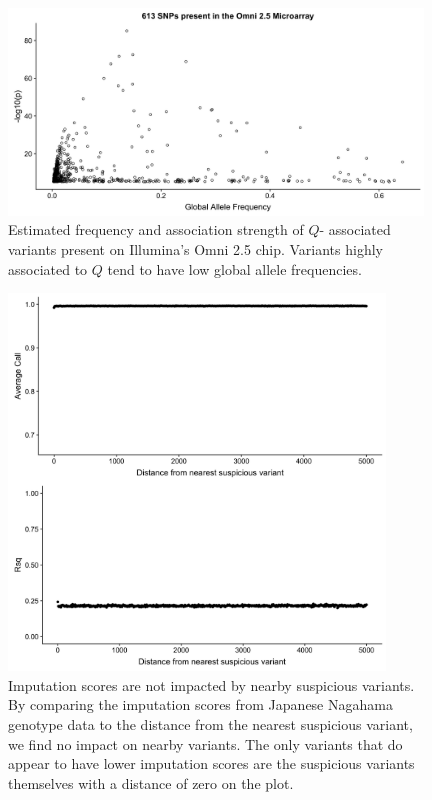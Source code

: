 \documentclass[9pt,article]{template}
\begin{document}
\begin{figure}[tbp]
\includegraphics[width=11cm,keepaspectratio]{Omni_AF.jpg}
\caption{Estimated frequency and association strength of $Q$- associated variants present on Illumina's Omni 2.5 chip. Variants highly associated to $Q$ tend to have low global allele frequencies.}
\label{Omni}
\end{figure}


\begin{figure}[tbp]
\centering
\includegraphics[width=10cm,keepaspectratio]{Imputation_Distance_100s_gw.jpg}
\caption{Imputation scores are not impacted by nearby suspicious variants. By comparing the imputation scores from Japanese Nagahama genotype data to the distance from the nearest suspicious variant, we find no impact on nearby variants. The only variants that do appear to have lower imputation scores are the suspicious variants themselves with a distance of zero on the plot. }  
\label{imputation_score}
\end{figure}
\end{document}
